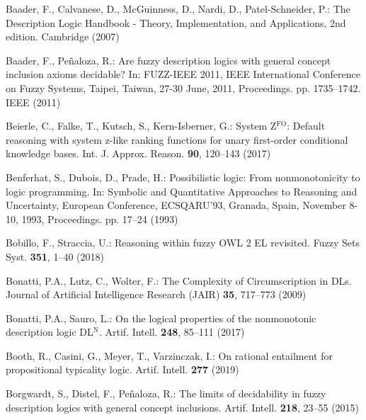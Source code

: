 \documentclass[runningheads]{llncs}
\begin{document}

\begin{thebibliography}{10}

Baader, F., Calvanese, D., McGuinness, D., Nardi, D., Patel-Schneider, P.: {The
  Description Logic Handbook - Theory, Implementation, and Applications, 2nd
  edition}. Cambridge (2007)

Baader, F., Pe{\~{n}}aloza, R.: Are fuzzy description logics with general
  concept inclusion axioms decidable? In: {FUZZ-IEEE} 2011, {IEEE}
  International Conference on Fuzzy Systems, Taipei, Taiwan, 27-30 June, 2011,
  Proceedings. pp. 1735--1742. {IEEE} (2011)

Beierle, C., Falke, T., Kutsch, S., Kern{-}Isberner, G.: System
  {Z\({}^{\mbox{FO}}\)}: Default reasoning with system z-like ranking functions
  for unary first-order conditional knowledge bases. Int. J. Approx. Reason.
  \textbf{90},  120--143 (2017)

Benferhat, S., Dubois, D., Prade, H.: Possibilistic logic: From nonmonotonicity
  to logic programming. In: Symbolic and Quantitative Approaches to Reasoning
  and Uncertainty, European Conference, ECSQARU'93, Granada, Spain, November
  8-10, 1993, Proceedings. pp. 17--24 (1993)

Bobillo, F., Straccia, U.: Reasoning within fuzzy {OWL} 2 {EL} revisited. Fuzzy
  Sets Syst.  \textbf{351},  1--40 (2018)

Bonatti, P.A., Lutz, C., Wolter, F.: {The Complexity of Circumscription in
  DLs}. Journal of Artificial Intelligence Research (JAIR)  \textbf{35},
  717--773 (2009)

Bonatti, P.A., Sauro, L.: On the logical properties of the nonmonotonic
  description logic {DL\({}^{\mbox{N}}\)}. Artif. Intell.  \textbf{248},
  85--111 (2017)

Booth, R., Casini, G., Meyer, T., Varzinczak, I.: On rational entailment for
  propositional typicality logic. Artif. Intell.  \textbf{277} (2019)

Borgwardt, S., Distel, F., Pe{\~{n}}aloza, R.: The limits of decidability in
  fuzzy description logics with general concept inclusions. Artif. Intell.
  \textbf{218},  23--55 (2015)


\end{thebibliography}
\end{document}
